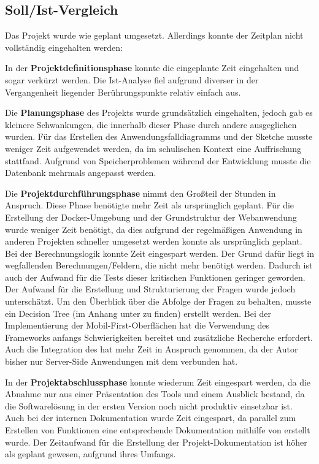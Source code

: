 \subsection{Soll/Ist-Vergleich}
\label{sec:Abschlussphase:Soll/Ist-Vergleich}

Das Projekt wurde wie geplant umgesetzt. Allerdings konnte der Zeitplan nicht vollständig eingehalten werden:

In der \textbf{Projektdefinitionsphase} konnte die eingeplante Zeit eingehalten und sogar verkürzt werden. Die Ist-Analyse fiel aufgrund diverser in der Vergangenheit liegender Berührungspunkte relativ einfach aus.

Die \textbf{Planungsphase} des Projekts wurde grundsätzlich eingehalten, jedoch gab es kleinere Schwankungen, die innerhalb dieser Phase durch andere ausgeglichen wurden. Für das Erstellen des Anwendungsfalldiagramms und der Sketche musste weniger Zeit aufgewendet werden, da im schulischen Kontext eine Auffrischung stattfand. Aufgrund von Speicherproblemen während der Entwicklung musste die Datenbank mehrmals angepasst werden.

Die \textbf{Projektdurchführungsphase} nimmt den Großteil der Stunden in Anspruch. Diese Phase benötigte mehr Zeit als ursprünglich geplant. Für die Erstellung der Docker-Umgebung und der Grundstruktur der Webanwendung wurde weniger Zeit benötigt, da dies aufgrund der regelmäßigen Anwendung in anderen Projekten schneller umgesetzt werden konnte als ursprünglich geplant. Bei der Berechnungslogik konnte Zeit eingespart werden. Der Grund dafür liegt in wegfallenden Berechnungen/Feldern, die nicht mehr benötigt werden. Dadurch ist auch der Aufwand für die Tests dieser kritischen Funktionen geringer geworden. Der Aufwand für die Erstellung und Strukturierung der Fragen wurde jedoch unterschätzt. Um den Überblick über die Abfolge der Fragen zu behalten, musste ein Decision Tree (im Anhang unter  zu finden) erstellt werden. Bei der Implementierung der Mobil-First-Oberflächen hat die Verwendung des Frameworks  anfangs Schwierigkeiten bereitet und zusätzliche Recherche erfordert. Auch die Integration des  hat mehr Zeit in Anspruch genommen, da der Autor bisher nur Server-Side Anwendungen mit dem  verbunden hat. 

In der \textbf{Projektabschlussphase} konnte wiederum Zeit eingespart werden, da die Abnahme nur aus einer Präsentation des Tools und einem Ausblick bestand, da die Softwarelösung in der ersten Version noch nicht produktiv einsetzbar ist. Auch bei der internen Dokumentation wurde Zeit eingespart, da parallel zum Erstellen von Funktionen eine entsprechende Dokumentation mithilfe von  erstellt wurde. Der Zeitaufwand für die Erstellung der Projekt-Dokumentation ist höher als geplant gewesen, aufgrund ihres Umfangs.

